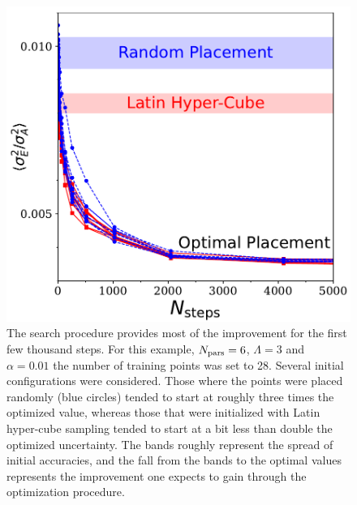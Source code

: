 \documentclass[UserManual.tex]{subfiles}
\begin{document}
\begin{figure}
\begin{minipage}{0.475\textwidth}
{}
\end{minipage}
\hspace*{0.025\textwidth}
\begin{minipage}{0.475\textwidth}
\includegraphics[width=\textwidth]{figs/sigma2vsNMC}
\caption{\label{fig:Sigma2vsNsteps}
The search procedure provides most of the improvement for the first few thousand steps. For this example, $N_{\rm pars}=6$, $\Lambda=3$ and $\alpha=0.01$ the number of training points was set to 28. Several initial configurations were considered. Those where the points were placed randomly (blue circles) tended to start at roughly three times the optimized value, whereas those that were initialized with Latin hyper-cube sampling tended to start at a bit less than double the optimized uncertainty. The bands roughly represent the spread of initial accuracies, and the fall from the bands to the optimal values represents the improvement one expects to gain through the optimization procedure.}
\end{minipage}
\end{figure}
\end{document}

